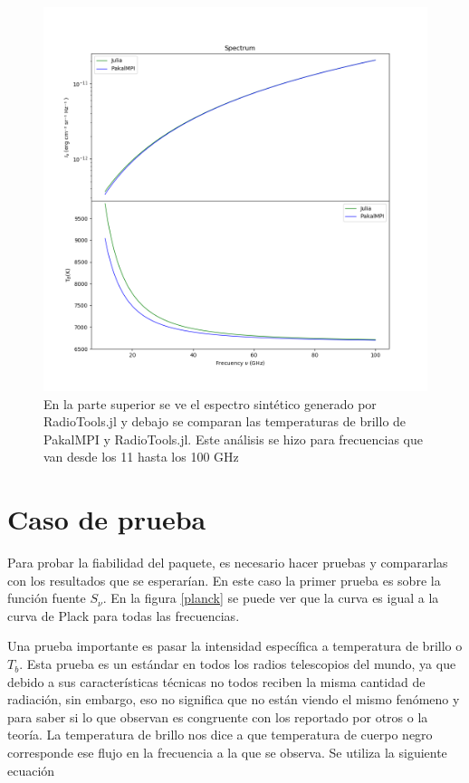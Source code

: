 \documentclass[a4paper]{article}
\begin{document}
\begin{figure}[!htbp]
\begin{center}
\includegraphics[width=15cm]{rtvspk.png}
\end{center}
\caption{En la parte superior se ve el espectro sintético generado por RadioTools.jl y debajo se comparan las temperaturas de brillo de PakalMPI y RadioTools.jl. Este análisis se hizo para frecuencias que van desde los 11 hasta los 100 GHz}\label{lines}
\end{figure}

\newpage
\section{Caso de prueba}
Para probar la fiabilidad del paquete, es necesario hacer pruebas y compararlas con los resultados que se esperarían. En este caso la primer prueba es sobre la función fuente $S_\nu$. En la figura \ref{planck} se puede ver que la curva es igual a la curva de Plack para todas las frecuencias. 

Una prueba importante es pasar la intensidad específica a temperatura de brillo o $T_b$. Esta prueba es un estándar en todos los radios telescopios del mundo, ya que debido a sus características técnicas no todos reciben la misma cantidad de radiación, sin embargo, eso no significa que no están viendo el mismo fenómeno y para saber si lo que observan es congruente con los reportado por otros o la teoría. 
La temperatura de brillo nos dice a que temperatura de cuerpo negro corresponde ese flujo en la frecuencia a la que se observa. Se utiliza la siguiente ecuación
\end{document}
